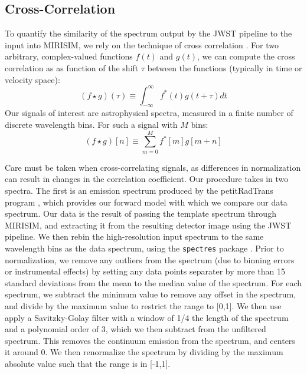 \subsection{Cross-Correlation}\label{sec:cc}
\cite{Snellen2014}%
\cite{Simkin1974} %
\cite{Tonry1979} %
\cite{Petermann2019} %
\cite{Bodis2007} %
To quantify the similarity of the spectrum output by the JWST pipeline to the input into MIRISIM, we rely on the technique of cross correlation \cite{}.
For two arbitrary, complex-valued functions $f(t)$ and $g(t)$, we can compute the cross correlation as as function of the shift $\tau$ between the functions (typically in time or velocity space):
\begin{equation}\label{eqn:crosscorr}
\left(f \star g\right)(\tau) \equiv \int_{-\infty}^{\infty}f^{*}(t)g(t + \tau)dt
\end{equation}
Our signals of interest are astrophysical spectra, measured in a finite number of discrete wavelength bins. For such a signal with $M$ bins:
\begin{equation}\label{eqn:discretecorr}
\left(f \star g\right)[n] \equiv \sum_{m=0}^{M}f^{*}[m]g[m + n]
\end{equation}

Care must be taken when cross-correlating signals, as differences in normalization can result in changes in the correlation coefficient. 
Our procedure takes in two spectra. 
The first is an emission spectrum produced by the petitRadTrans program \cite{Molliere2019}, which provides our forward model with which we compare our data spectrum.
Our data is the result of passing the template spectrum through MIRISIM, and extracting it from the resulting detector image using the JWST pipeline.
We then rebin the high-resolution input spectrum to the same wavelength bins as the data spectrum, using the \verb|spectres| package \parencite{Carnall2017}.
Prior to normalization, we remove any outliers from the spectrum (due to binning errors or instrumental effects) by setting any data points separater by more than 15 standard deviations from the mean to the median value of the spectrum.
For each spectrum, we subtract the minimum value to remove any offset in the spectrum, and divide by the maximum value to restrict the range to [0,1]. 
We then use apply a Savitzky-Golay filter with a window of 1/4 the length of the spectrum and a polynomial order of 3, which we then subtract from the unfiltered spectrum. 
This removes the continuum emission from the spectrum, and centers it around 0.
We then renormalize the spectrum by dividing by the maximum absolute value such that the range is in [-1,1]. 

